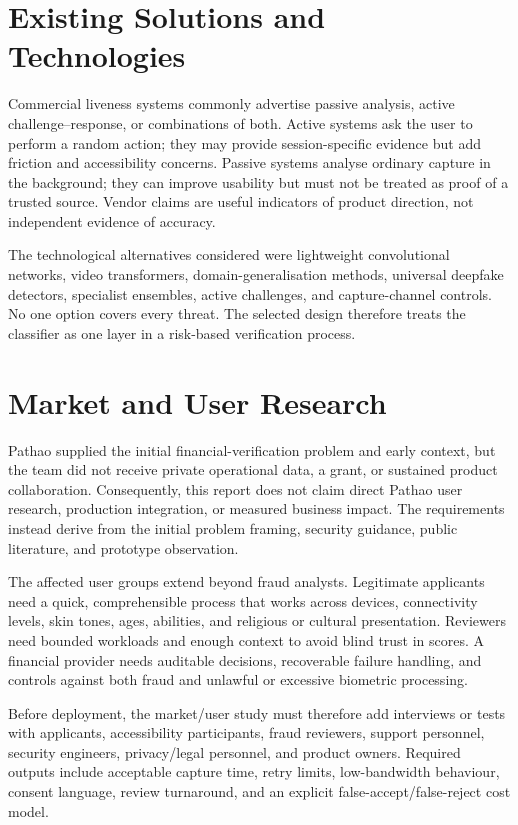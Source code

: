 \section{Existing Solutions and Technologies}

Commercial liveness systems commonly advertise passive analysis, active
challenge--response, or combinations of both. Active systems ask the user to
perform a random action; they may provide session-specific evidence but add
friction and accessibility concerns. Passive systems analyse ordinary capture in
the background; they can improve usability but must not be treated as proof of a
trusted source. Vendor claims are useful indicators of product direction, not
independent evidence of accuracy.

The technological alternatives considered were lightweight convolutional
networks, video transformers, domain-generalisation methods, universal deepfake
detectors, specialist ensembles, active challenges, and capture-channel controls.
No one option covers every threat. The selected design therefore treats the
classifier as one layer in a risk-based verification process.

\section{Market and User Research}

Pathao supplied the initial financial-verification problem and early context, but
the team did not receive private operational data, a grant, or sustained product
collaboration. Consequently, this report does not claim direct Pathao user
research, production integration, or measured business impact. The requirements
instead derive from the initial problem framing, security guidance, public
literature, and prototype observation.

The affected user groups extend beyond fraud analysts. Legitimate applicants need
a quick, comprehensible process that works across devices, connectivity levels,
skin tones, ages, abilities, and religious or cultural presentation. Reviewers
need bounded workloads and enough context to avoid blind trust in scores. A
financial provider needs auditable decisions, recoverable failure handling, and
controls against both fraud and unlawful or excessive biometric processing.

Before deployment, the market/user study must therefore add interviews or tests
with applicants, accessibility participants, fraud reviewers, support personnel,
security engineers, privacy/legal personnel, and product owners. Required outputs
include acceptable capture time, retry limits, low-bandwidth behaviour, consent
language, review turnaround, and an explicit false-accept/false-reject cost model.

